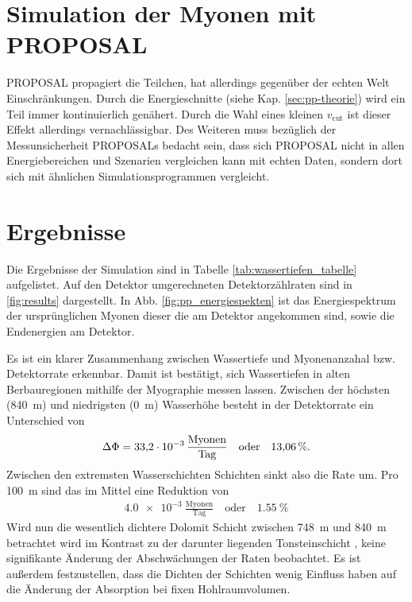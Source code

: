 \section{Simulation der Myonen mit PROPOSAL}

PROPOSAL propagiert die Teilchen, hat allerdings gegenüber der echten Welt Einschränkungen.
Durch die Energieschnitte (siehe Kap. \ref{sec:pp-theorie}) wird ein Teil immer
kontinuierlich genähert. Durch die Wahl eines kleinen $v_\mathrm{cut}$ ist dieser Effekt 
allerdings vernachlässigbar.
Des Weiteren muss bezüglich der Messunsicherheit PROPOSALs 
bedacht sein, dass sich PROPOSAL nicht in allen Energiebereichen 
und Szenarien vergleichen kann mit echten Daten, sondern dort sich mit
ähnlichen Simulationsprogrammen vergleicht. 


\section{Ergebnisse}
\label{sec:pp-config}

Die Ergebnisse der Simulation sind in Tabelle \ref{tab:wassertiefen_tabelle} aufgelistet.
Auf den Detektor umgerechneten Detektorzählraten sind in \ref{fig:results} dargestellt.
In Abb. \ref{fig:pp_energiespekten} ist das Energiespektrum der ursprünglichen Myonen 
dieser die am Detektor angekommen sind, sowie die Endenergien am Detektor. 

Es ist ein klarer Zusammenhang zwischen Wassertiefe und Myonenanzahal bzw. Detektorrate erkennbar.
Damit ist bestätigt, sich Wassertiefen in alten Berbauregionen mithilfe der Myographie messen lassen.
Zwischen der höchsten (\SI[]{840}[]{m}) und niedrigsten (\SI[]{0}[]{m}) Wasserhöhe
besteht in der Detektorrate ein Unterschied von
\begin{equation}
    \Delta\Phi = \SI[]{33.2 e - 3}[]{\frac{\mathrm{Myonen}}{\mathrm{Tag}}}
    \quad \mathrm{oder}\quad \SI[]{13,06}{\%}.
\end{equation}
Zwischen den extremsten Wasserschichten Schichten sinkt also die Rate um.
Pro \SI[]{100}[]{m} sind das im Mittel eine Reduktion von
\begin{align}
    \SI[]{4.0 e-3}[]{\frac{\mathrm{Myonen}}{\mathrm{Tag}}} \quad \mathrm{oder}\quad  \SI[]{1,55}[]{\%}
\end{align}
Wird nun die wesentlich dichtere Dolomit Schicht zwischen \SI[]{748}{m} und \SI[]{840}[]{m}
betrachtet wird im Kontrast zu der darunter liegenden Tonsteinschicht
, keine signifikante Änderung der Abschwächungen der Raten beobachtet.
Es ist außerdem festzustellen, dass die Dichten der Schichten 
wenig Einfluss haben auf die Änderung der Absorption bei fixen Hohlraumvolumen. 


